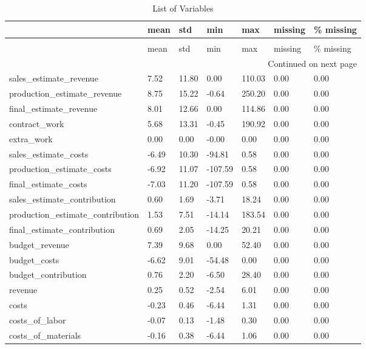 \begin{landscape}\begin{longtable}[h!]{lllllll}
\caption{List of Variables} \label{eda_1} \\
\toprule
 & mean & std & min & max & missing & \% missing \\
\midrule
\endfirsthead
\caption[]{List of Variables} \\
\toprule
 & mean & std & min & max & missing & \% missing \\
\midrule
\endhead
\midrule
\multicolumn{7}{r}{Continued on next page} \\
\midrule
\endfoot
\bottomrule
\endlastfoot
sales_estimate_revenue & 7.52 & 11.80 & 0.00 & 110.03 & 0.00 & 0.00 \\
production_estimate_revenue & 8.75 & 15.22 & -0.64 & 250.20 & 0.00 & 0.00 \\
final_estimate_revenue & 8.01 & 12.66 & 0.00 & 114.86 & 0.00 & 0.00 \\
contract_work & 5.68 & 13.31 & -0.45 & 190.92 & 0.00 & 0.00 \\
extra_work & 0.00 & 0.00 & -0.00 & 0.00 & 0.00 & 0.00 \\
sales_estimate_costs & -6.49 & 10.30 & -94.81 & 0.58 & 0.00 & 0.00 \\
production_estimate_costs & -6.92 & 11.07 & -107.59 & 0.58 & 0.00 & 0.00 \\
final_estimate_costs & -7.03 & 11.20 & -107.59 & 0.58 & 0.00 & 0.00 \\
sales_estimate_contribution & 0.60 & 1.69 & -3.71 & 18.24 & 0.00 & 0.00 \\
production_estimate_contribution & 1.53 & 7.51 & -14.14 & 183.54 & 0.00 & 0.00 \\
final_estimate_contribution & 0.69 & 2.05 & -14.25 & 20.21 & 0.00 & 0.00 \\
budget_revenue & 7.39 & 9.68 & 0.00 & 52.40 & 0.00 & 0.00 \\
budget_costs & -6.62 & 9.01 & -54.48 & 0.00 & 0.00 & 0.00 \\
budget_contribution & 0.76 & 2.20 & -6.50 & 28.40 & 0.00 & 0.00 \\
revenue & 0.25 & 0.52 & -2.54 & 6.01 & 0.00 & 0.00 \\
costs & -0.23 & 0.46 & -6.44 & 1.31 & 0.00 & 0.00 \\
costs_of_labor & -0.07 & 0.13 & -1.48 & 0.30 & 0.00 & 0.00 \\
costs_of_materials & -0.16 & 0.38 & -6.44 & 1.06 & 0.00 & 0.00 \\

\end{longtable}
\end{landscape}
